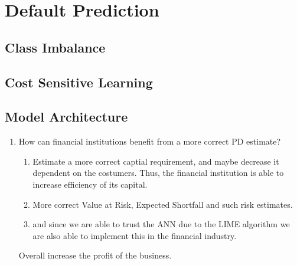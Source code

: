     \section{Default Prediction}
    
        \subsection{Class Imbalance}
        
        \subsection{Cost Sensitive Learning}
        
        \subsection{Model Architecture}
\begin{enumerate}
    \item How can financial institutions benefit from a more correct PD estimate?
    \begin{enumerate}
        \item Estimate a more correct captial requirement, and maybe decrease it dependent on the costumers. Thus, the financial institution is able to increase efficiency of its capital. 
        \item More correct Value at Risk, Expected Shortfall and such risk estimates. 
        \item and since we are able to trust the ANN due to the LIME algorithm we are also able to implement this in the financial industry.
    \end{enumerate}
    
    Overall increase the profit of the business.
\end{enumerate}